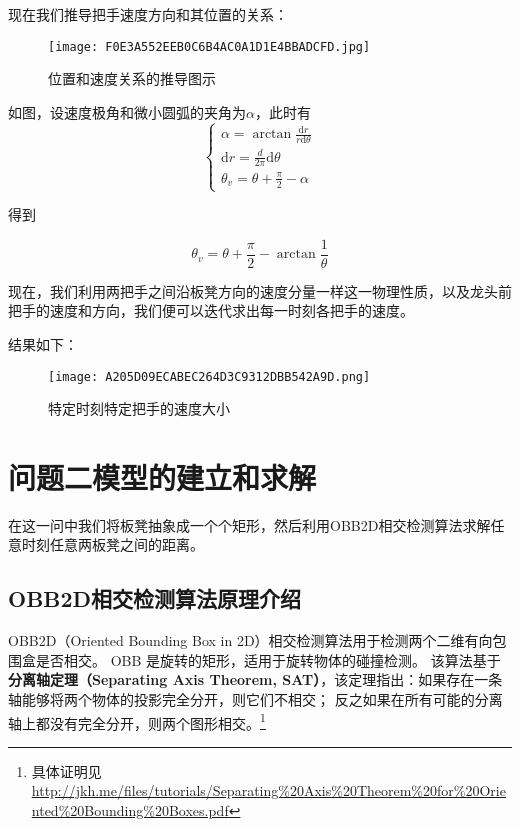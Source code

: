 \documentclass[withoutpreface,bwprint]{cumcmthesis} %
\begin{document}
现在我们推导把手速度方向和其位置的关系：

\begin{figure}[H]  
    \centering
    \texttt{[image: F0E3A552EEB0C6B4AC0A1D1E4BBADCFD.jpg]} %
    \caption{位置和速度关系的推导图示}
\end{figure}

如图，设速度极角和微小圆弧的夹角为$\alpha$，此时有
$$
\begin{cases}
\alpha = \arctan \displaystyle \frac {\mathrm d r}{r\mathrm d \theta} \\
\mathrm d r = \displaystyle{\frac {d}{2\pi}} \mathrm d \theta \\
\theta_v = \theta + \displaystyle{\frac \pi 2} -\alpha 
\end{cases}
$$

得到 

$$
\theta_v = \theta + \frac {\pi} {2} - \arctan \frac 1 \theta
$$

现在，我们利用两把手之间沿板凳方向的速度分量一样这一物理性质，以及龙头前把手的速度和方向，我们便可以迭代求出每一时刻各把手的速度。

结果如下：
\begin{figure}[H]  
    \centering
    \texttt{[image: A205D09ECABEC264D3C9312DBB542A9D.png]} %
    \caption{特定时刻特定把手的速度大小}
\end{figure}

\section{问题二模型的建立和求解}

在这一问中我们将板凳抽象成一个个矩形，然后利用OBB2D相交检测算法求解任意时刻任意两板凳之间的距离。

\subsection{OBB2D相交检测算法原理介绍}

OBB2D（Oriented Bounding Box in 2D）相交检测算法用于检测两个二维有向包围盒是否相交。
OBB 是旋转的矩形，适用于旋转物体的碰撞检测。
该算法基于\textbf{分离轴定理（Separating Axis Theorem, SAT）}，该定理指出：如果存在一条轴能够将两个物体的投影完全分开，则它们不相交；
反之如果在所有可能的分离轴上都没有完全分开，则两个图形相交。\footnote{具体证明见 \url{http://jkh.me/files/tutorials/Separating\%20Axis\%20Theorem\%20for\%20Oriented\%20Bounding\%20Boxes.pdf}}
\end{document}
